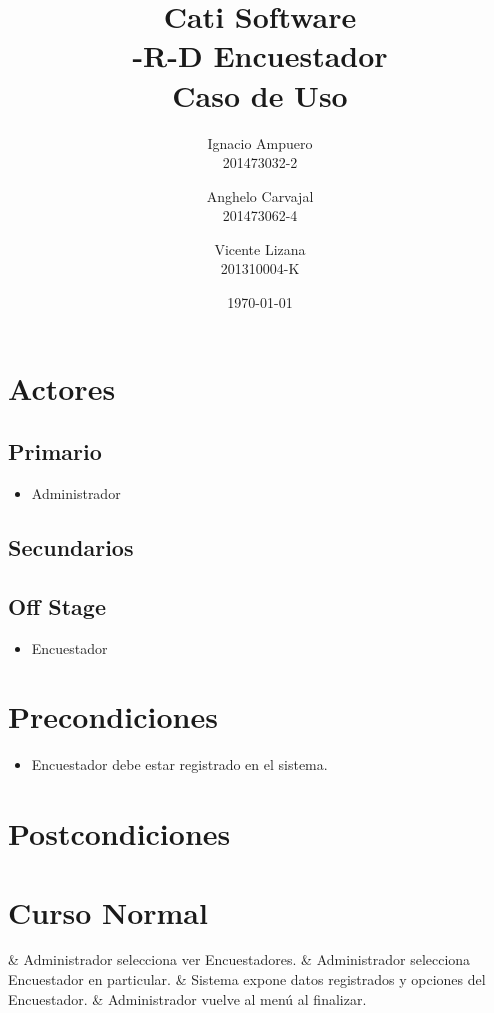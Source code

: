 \documentclass[fleqn]{article}
\title{\huge Cati Software\\ \Huge -R-D Encuestador\\ \Large Caso de Uso \vspace{30pt}}
\author{Ignacio Ampuero\\ 201473032-2 \and Anghelo Carvajal\\ 201473062-4 \and Vicente Lizana\\ 201310004-K}
\date{\today}
\begin{document}
\maketitle
\vspace{30pt}

\section{Actores}

	\subsection{Primario}
	
	\begin{itemize}
		\item Administrador
	\end{itemize}
	
	\subsection{Secundarios}
	
	\subsection{Off Stage}
	
	\begin{itemize}
		\item Encuestador
	\end{itemize}

\section{Precondiciones}

\begin{itemize}
	\item Encuestador debe estar registrado en el sistema.
\end{itemize}

\section{Postcondiciones}

\section{Curso Normal}

\begin{easylist}
	& Administrador selecciona ver Encuestadores.
	& Administrador selecciona Encuestador en particular.
	& Sistema expone datos registrados y opciones del Encuestador.
	& Administrador vuelve al menú al finalizar.
\end{easylist}
\end{document}
